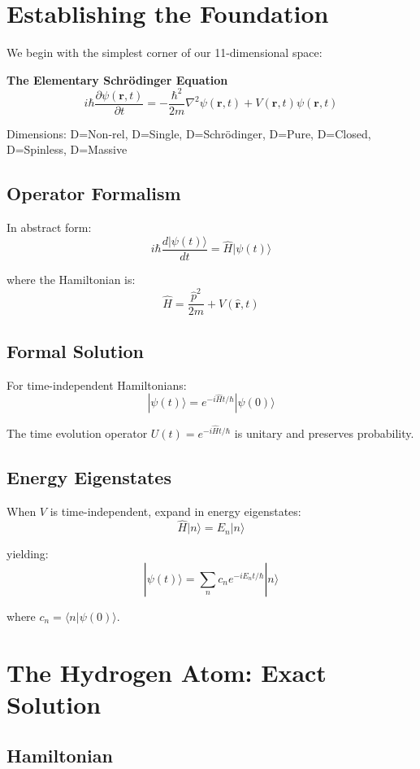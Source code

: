 \documentclass[12pt,oneside]{book}
\begin{document}
\section{Establishing the Foundation}

We begin with the simplest corner of our 11-dimensional space:

\textbf{The Elementary Schrödinger Equation}
$$i\hbar\frac{\partial\psi(\mathbf{r},t)}{\partial t} = -\frac{\hbar^2}{2m}\nabla^2\psi(\mathbf{r},t) + V(\mathbf{r},t)\psi(\mathbf{r},t)$$

Dimensions: D=Non-rel, D=Single, D=Schrödinger, D=Pure, D=Closed, D=Spinless, D=Massive

\subsection{Operator Formalism}

In abstract form:
$$i\hbar\frac{d|\psi(t)\rangle}{dt} = \hat{H}|\psi(t)\rangle$$

where the Hamiltonian is:
$$\hat{H} = \frac{\hat{p}^2}{2m} + V(\hat{\mathbf{r}},t)$$

\subsection{Formal Solution}

For time-independent Hamiltonians:
$$|\psi(t)\rangle = e^{-i\hat{H}t/\hbar}|\psi(0)\rangle$$

The time evolution operator $U(t) = e^{-i\hat{H}t/\hbar}$ is unitary and preserves probability.

\subsection{Energy Eigenstates}

When $V$ is time-independent, expand in energy eigenstates:
$$\hat{H}|n\rangle = E_n|n\rangle$$

yielding:
$$|\psi(t)\rangle = \sum_n c_n e^{-iE_n t/\hbar}|n\rangle$$

where $c_n = \langle n|\psi(0)\rangle$.

\section{The Hydrogen Atom: Exact Solution}

\subsection{Hamiltonian}
\end{document}
